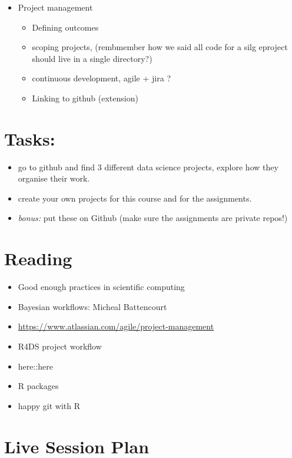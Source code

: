\documentclass[
  12pt,
]{book}
\providecommand{\tightlist}{%
  \setlength{\itemsep}{0pt}\setlength{\parskip}{0pt}}
\theoremstyle{definition}
\theoremstyle{definition}
\theoremstyle{definition}
\theoremstyle{definition}
\theoremstyle{remark}
\begin{document}
\begin{itemize}
\tightlist
\item
  Project management

  \begin{itemize}
  \tightlist
  \item
    Defining outcomes
  \item
    scoping projects, (rembmember how we said all code for a silg eproject should live in a single directory?)
  \item
    continuous development, agile + jira ?
  \item
    Linking to github (extension)
  \end{itemize}
\end{itemize}

\hypertarget{tasks}{%
\section{Tasks:}\label{tasks}}

\begin{itemize}
\tightlist
\item
  go to github and find 3 different data science projects, explore how they organise their work.
\item
  create your own projects for this course and for the assignments.
\item
  \emph{bonus:} put these on Github (make sure the assignments are private repos!)
\end{itemize}

\hypertarget{reading}{%
\section{Reading}\label{reading}}

\begin{itemize}
\item
  Good enough practices in scientific computing
\item
  Bayesian workflows: Micheal Battencourt
\item
  \url{https://www.atlassian.com/agile/project-management}
\item
  R4DS project workflow
\item
  here::here
\item
  R packages
\item
  happy git with R
\end{itemize}

\hypertarget{live-session-plan}{%
\section{Live Session Plan}\label{live-session-plan}}
\end{document}
